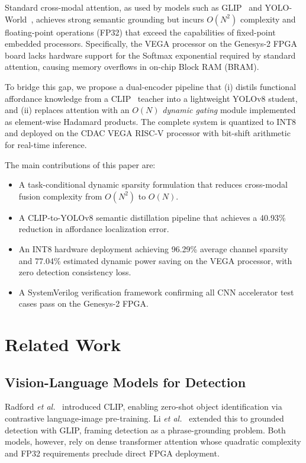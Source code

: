 \documentclass[conference]{IEEEtran}
\begin{document}
Standard cross-modal attention, as used by models such as GLIP~\cite{li2022grounded}
and YOLO-World~\cite{cheng2024yoloworld}, achieves strong semantic grounding but
incurs $O(N^{2})$ complexity and floating-point operations (FP32) that exceed the
capabilities of fixed-point embedded processors. Specifically, the VEGA processor
on the Genesys-2 FPGA board lacks hardware support for the Softmax exponential
required by standard attention, causing memory overflows in on-chip Block RAM (BRAM).

To bridge this gap, we propose a dual-encoder pipeline that (i) distils functional
affordance knowledge from a CLIP~\cite{radford2021clip} teacher into a lightweight
YOLOv8 student, and (ii) replaces attention with an $O(N)$ \emph{dynamic gating}
module implemented as element-wise Hadamard products. The complete system is
quantized to INT8 and deployed on the CDAC VEGA RISC-V processor with bit-shift
arithmetic for real-time inference.

The main contributions of this paper are:
\begin{itemize}
    \item A task-conditional dynamic sparsity formulation that reduces cross-modal
          fusion complexity from $O(N^{2})$ to $O(N)$.
    \item A CLIP-to-YOLOv8 semantic distillation pipeline that achieves a 40.93\%
          reduction in affordance localization error.
    \item An INT8 hardware deployment achieving 96.29\% average channel sparsity
          and 77.04\% estimated dynamic power saving on the VEGA processor, with
          zero detection consistency loss.
    \item A SystemVerilog verification framework confirming all CNN accelerator
          test cases pass on the Genesys-2 FPGA.
\end{itemize}

\section{Related Work}

\subsection{Vision-Language Models for Detection}
Radford \emph{et al.}~\cite{radford2021clip} introduced CLIP, enabling zero-shot
object identification via contrastive language-image pre-training. Li \emph{et
al.}~\cite{li2022grounded} extended this to grounded detection with GLIP, framing
detection as a phrase-grounding problem. Both models, however, rely on dense
transformer attention whose quadratic complexity and FP32 requirements preclude
direct FPGA deployment.
\end{document}
